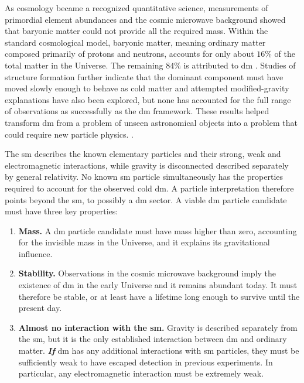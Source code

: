 As cosmology became a recognized quantitative science, measurements of primordial element
abundances and the cosmic microwave background showed that baryonic
matter could not provide all the required mass. Within the standard
cosmological model, baryonic matter, meaning ordinary matter composed primarily
of protons and neutrons, accounts for only about \(16\%\) of the total matter
in the Universe. The remaining \(84\%\) is attributed to \gls{dm}
\cite{cirelli2026-darkmatter}. 
Studies of structure formation further indicate that the dominant component must have moved slowly enough to behave as cold matter and attempted modified-gravity explanations have also been
explored, but none has accounted for the full range of observations as
successfully as the \gls{dm} framework.
These results helped transform \gls{dm} from a problem of unseen
astronomical objects into a problem that could require new particle physics. \cite{bertone2016-history-dark-matter,cirelli2026-darkmatter}.

 

The \gls{sm} describes the known elementary particles and their strong, weak
and electromagnetic interactions, while gravity is disconnected described separately by
general relativity. No known \gls{sm} particle simultaneously has the
properties required to account for the observed cold \gls{dm}. A particle
interpretation therefore points beyond the \gls{sm}, to possibly a \gls{dm} sector. 
A viable \gls{dm} particle
candidate must have three key properties:




\begin{enumerate}
    \item \textbf{Mass.} A \gls{dm} particle candidate must have mass higher than zero, accounting for the invisible mass in the Universe, and it explains its gravitational influence.
    \item \textbf{Stability.} 
    Observations in the cosmic microwave background imply 
    the existence of \gls{dm} in the early Universe and it remains abundant today. It must therefore be stable, or at least have a lifetime long
    enough to survive until the present day.
    \item \textbf{Almost no interaction with the \gls{sm}.} Gravity is described separately from the \gls{sm}, but it is the only established interaction between \gls{dm} and ordinary matter. \textbf{\emph{If}} \gls{dm} has any additional interactions with \gls{sm} particles, they must be sufficiently weak to have escaped detection in previous experiments. In particular, any electromagnetic interaction must be extremely weak.
\end{enumerate}


